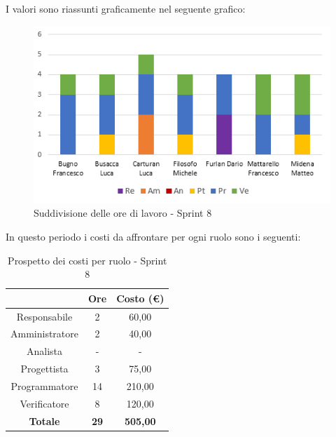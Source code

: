 I valori sono riassunti graficamente nel seguente grafico:

\begin{figure}[H]
  \centering
  \includegraphics[scale=1.0]{immagini/8Sprint_oreLavoro.png}
  \caption{Suddivisione delle ore di lavoro - Sprint 8}
\end{figure}

\pagebreak
In questo periodo i costi da affrontare per ogni ruolo sono i seguenti:

\begin{table}[H]
  \centering
  \renewcommand{\arraystretch}{1.8}
  \begin{tabular}{c|c|c}
    \rowcolor[HTML]{125E28}
    \multicolumn{1}{c}{\color[HTML]{FFFFFF}\textbf{Ruolo}}
                    & \multicolumn{1}{c}{\color[HTML]{FFFFFF}\textbf{Ore}}
                    & \multicolumn{1}{c}{\color[HTML]{FFFFFF}\textbf{Costo (€)}}                   \\
    \hline
    Responsabile    & 2                                                          & 60,00           \\
    Amministratore  & 2                                                          & 40,00           \\
    Analista        & -                                                          & -               \\
    Progettista     & 3                                                          & 75,00           \\
    Programmatore   & 14                                                         & 210,00          \\
    Verificatore    & 8                                                          & 120,00          \\
    \textbf{Totale} & \textbf{29}                                                & \textbf{505,00}
  \end{tabular}
  \caption{Prospetto dei costi per ruolo - Sprint 8}
\end{table}

